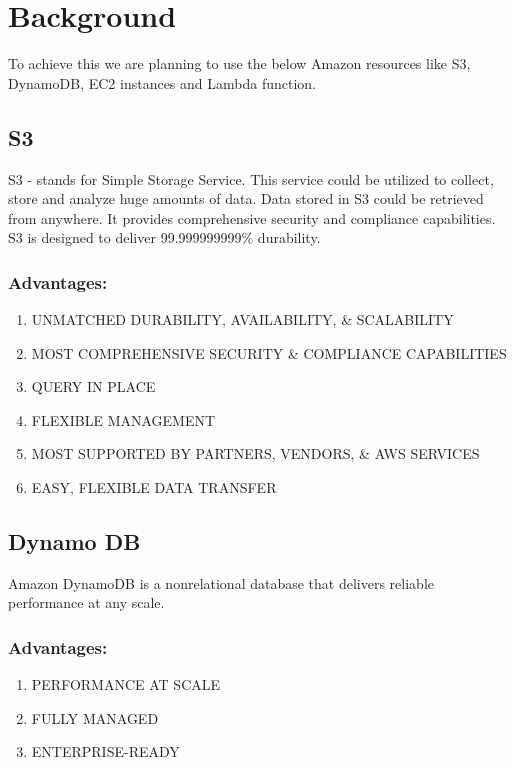\chapter{Background}\label{chap:background}

To achieve this we are planning to use the below Amazon resources like  S3, DynamoDB, EC2 instances and Lambda function. 

\section{S3}

S3 - stands for Simple Storage Service. This service could be utilized to collect, store and analyze huge amounts of data. Data stored in S3 could be retrieved from anywhere. It provides comprehensive security and compliance capabilities. S3 is designed to deliver 99.999999999\% durability.\\

\subsection{Advantages:}
\begin{enumerate}
	\item UNMATCHED DURABILITY, AVAILABILITY, \& SCALABILITY
	\item MOST COMPREHENSIVE SECURITY \& COMPLIANCE CAPABILITIES
	\item QUERY IN PLACE
	\item FLEXIBLE MANAGEMENT
	\item MOST SUPPORTED BY PARTNERS, VENDORS, \& AWS SERVICES
	\item EASY, FLEXIBLE DATA TRANSFER
\end{enumerate}

\section{Dynamo DB}
Amazon DynamoDB is a nonrelational database that delivers reliable performance at any scale.

\subsection{Advantages:}
\begin{enumerate}
	\item PERFORMANCE AT SCALE
	\item FULLY MANAGED
	\item ENTERPRISE-READY
\end{enumerate}


